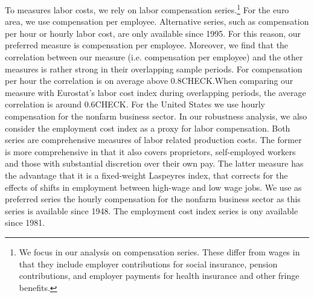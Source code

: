 \documentclass[11pt]{article}
\begin{document}
To measures labor costs, we rely on labor compensation series.\footnote{We focus in our analysis on compensation series. These differ from wages in that they include employer contributions for social insurance, pension contributions, and employer payments for health insurance and other fringe benefits.} For the euro area, we use compensation per employee. Alternative series, such as compensation per hour or hourly labor cost, are only available since 1995. For this reason, our preferred measure is compensation per employee. Moreover, we find that the correlation between our measure (i.e. compensation per employee) and the other measures is rather strong in their overlapping sample periods. For compensation per hour the correlation is on average above 0.8CHECK.When comparing our measure with Eurostat's labor cost index during overlapping periods, the average correlation is around 0.6CHECK. For the United States we use hourly compensation for the nonfarm business sector. In our robustness analysis, we also consider the employment cost index as a proxy for labor compensation. Both series are comprehensive measures of labor related production costs. The former is more comprehensive in that it also covers proprietors, self-employed workers and those with substantial discretion over their own pay. The latter measure has the advantage that it is a fixed-weight Laspeyres index, that corrects for the effects of shifts in employment between high-wage and low wage jobs. We use as preferred series the hourly compensation for the nonfarm business sector as this series is available since 1948. The employment cost index series is ony available since 1981. %
\end{document}
